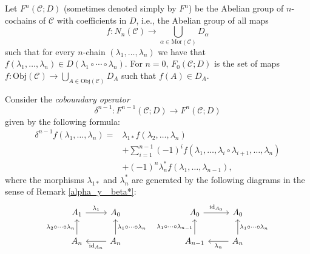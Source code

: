 \documentclass[12pt,reqno]{amsart}
\theoremstyle{definition}
\theoremstyle{remark}
\numberwithin{figure}{section}%
\newcommand{\CC}{\mathcal{C}}
\newcommand{\id}{\mathrm{id}}
\begin{document}
Let  $F^n(\CC;D)$ (sometimes denoted simply by $F^n$) be the Abelian group of $n$-cochains of $\CC$ with coefficients in $D$, i.e., the Abelian group of all maps $$f\colon N_n(\CC) \rightarrow \bigcup_{\alpha \in \mathrm{Mor}(\CC)} D_\alpha$$ such that for every $n$-chain $(\lambda_1, \dots, \lambda_n)$ we have that $f(\lambda_1, \dots, \lambda_n) \in D(\lambda_1 \circ \cdots \circ \lambda_n)$. For $n=0$,  $F_0(\CC;D)$ is the set of maps  $f\colon \mathrm{Obj} (\CC) \to \bigcup_{A \in \mathrm{Obj}(\CC)} D_A$ such that $f(A) \in D_A$.

Consider the {\em coboundary operator} 
$$\delta^{n-1}: F^{n-1}(\CC;D) \rightarrow F^{n}(\CC;D)$$ 
given by the following formula:
    \begin{align*}
\delta^{n-1} f(\lambda_1,\ldots, \lambda_{n})=&\lambda_{1*}f(\lambda_2,\ldots, \lambda_{n})\\&+\sum_{i=1}^{n-1} (-1)^i f(\lambda_1, \ldots, \lambda_i \circ \lambda_{i+1}, \ldots, \lambda_{n})  \\&+ (-1)^n \lambda_{n}^* f(\lambda_1,\ldots, \lambda_{n-1}),
\end{align*}
    where the morphisms $\lambda_{1*}$ and $\lambda_n^*$ are generated by the following diagrams in the sense of Remark \ref{alpha_y _beta*}: 
$$
\begin{tikzcd}
A_1 \arrow[r, "\lambda_1"]                               & A_0                                                                                 &  & A_0 \arrow[r, "\id_{A_0}"]                               & A_0                                                                                  \\
A_{n} \arrow[u, "\lambda_2 \circ \cdots \circ \lambda_{n}"] & A_{n} \arrow[l, "\id_{A_{n}}"] \arrow[u, "\lambda_1 \circ \cdots \circ \lambda_{n}"'] &\quad  & A_{n-1} \arrow[u, "\lambda_1 \circ \cdots \circ \lambda_{n-1}"] & A_{n} \arrow[u, "\lambda_1 \circ \cdots \circ \lambda_{n}"'] \arrow[l, "\lambda_{n}"]
\end{tikzcd}
$$
\end{document}
